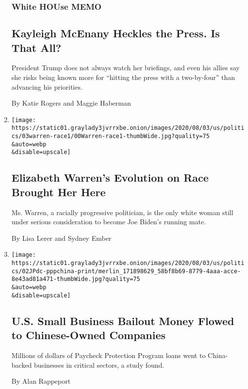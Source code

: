 \begin{enumerate}
  \hypertarget{white-house-memo}{%
  \subsubsection{White HOUse MEMO}\label{white-house-memo}}

  \hypertarget{kayleigh-mcenany-heckles-the-press-is-that-all}{%
  \subsection{Kayleigh McEnany Heckles the Press. Is That
  All?}\label{kayleigh-mcenany-heckles-the-press-is-that-all}}

  President Trump does not always watch her briefings, and even his
  allies say she risks being known more for ``hitting the press with a
  two-by-four'' than advancing his priorities.

  By Katie Rogers and Maggie Haberman
\item
  \href{/2020/08/02/us/politics/elizabeth-warren-biden-vice-president.html}{}

  \texttt{[image: https://static01.graylady3jvrrxbe.onion/images/2020/08/03/us/politics/03warren-race1/00Warren-race1-thumbWide.jpg?quality=75\\\&auto=webp\\\&disable=upscale]}

  \hypertarget{elizabeth-warrens-evolution-on-race-brought-her-here-1}{%
  \subsection{Elizabeth Warren's Evolution on Race Brought Her
  Here}\label{elizabeth-warrens-evolution-on-race-brought-her-here-1}}

  Ms. Warren, a racially progressive politician, is the only white woman
  still under serious consideration to become Joe Biden's running mate.

  By Lisa Lerer and Sydney Ember
\item
  \href{/2020/08/02/us/politics/virus-china-ppp-small-business-loans.html}{}

  \texttt{[image: https://static01.graylady3jvrrxbe.onion/images/2020/08/03/us/politics/02JPdc-pppchina-print/merlin\_171898629\_58bf8b69-8779-4aaa-acce-8e43ad81a471-thumbWide.jpg?quality=75\\\&auto=webp\\\&disable=upscale]}

  \hypertarget{us-small-business-bailout-money-flowed-to-chinese-owned-companies-1}{%
  \subsection{U.S. Small Business Bailout Money Flowed to Chinese-Owned
  Companies}\label{us-small-business-bailout-money-flowed-to-chinese-owned-companies-1}}

  Millions of dollars of Paycheck Protection Program loans went to
  China-backed businesses in critical sectors, a study found.

  By Alan Rappeport
\end{enumerate}

